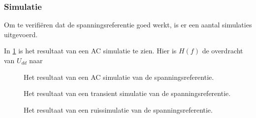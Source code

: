 \subsubsection{Simulatie}

Om te verifiëren dat de spanningsreferentie goed werkt, is er een aantal simulaties uitgevoerd.

In \cref{fig:referenceSimFreq} is het resultaat van een AC simulatie te zien. Hier is $H(f)$ de overdracht van $U_{dd}$ naar

\begin{figure}[!htbp]
    \centering
    \pgfplotsset{width=0.7\textwidth}
    
    \caption{Het resultaat van een AC simulatie van de spanningsreferentie.}
    \label{fig:referenceSimFreq}
\end{figure}


\begin{figure}[!htbp]
    \centering
    \pgfplotsset{width=0.7\textwidth}
    
    \caption{Het resultaat van een transient simulatie van de spanningsreferentie.}
    \label{fig:referenceSimTrans}
\end{figure}


\begin{figure}[!htbp]
    \centering
    \pgfplotsset{width=0.7\textwidth}
    
    \caption{Het resultaat van een ruissimulatie van de spanningsreferentie.}
    \label{fig:referenceSimNoise}
\end{figure}

